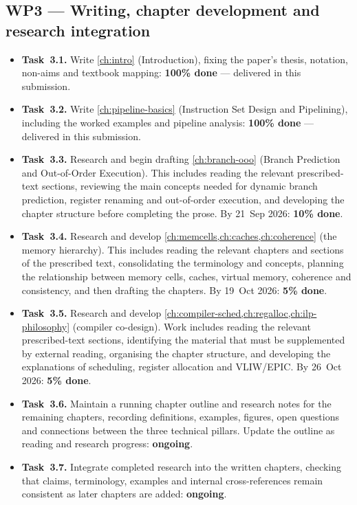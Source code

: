 \documentclass[12pt,a4paper]{report}
\begin{document}
\subsection*{WP3 --- Writing, chapter development and research integration}
\begin{itemize}[leftmargin=*]
  \item \textbf{Task~3.1.} Write \cref{ch:intro} (Introduction), fixing
    the paper's thesis, notation, non-aims and textbook mapping:
    \textbf{100\% done} --- delivered in this submission.

  \item \textbf{Task~3.2.} Write \cref{ch:pipeline-basics} (Instruction
    Set Design and Pipelining), including the worked examples and
    pipeline analysis: \textbf{100\% done} --- delivered in this
    submission.

  \item \textbf{Task~3.3.} Research and begin drafting
    \cref{ch:branch-ooo} (Branch Prediction and Out-of-Order
    Execution). This includes reading the relevant prescribed-text
    sections, reviewing the main concepts needed for dynamic branch
    prediction, register renaming and out-of-order execution, and
    developing the chapter structure before completing the prose. By
    21~Sep 2026: \textbf{10\% done}.

  \item \textbf{Task~3.4.} Research and develop
    \cref{ch:memcells,ch:caches,ch:coherence} (the memory hierarchy).
    This includes reading the relevant chapters and sections of the
    prescribed text, consolidating the terminology and concepts,
    planning the relationship between memory cells, caches, virtual
    memory, coherence and consistency, and then drafting the chapters.
    By 19~Oct 2026: \textbf{5\% done}.

  \item \textbf{Task~3.5.} Research and develop
    \cref{ch:compiler-sched,ch:regalloc,ch:ilp-philosophy} (compiler
    co-design). Work includes reading the relevant prescribed-text
    sections, identifying the material that must be supplemented by
    external reading, organising the chapter structure, and developing
    the explanations of scheduling, register allocation and VLIW/EPIC.
    By 26~Oct 2026: \textbf{5\% done}.

  \item \textbf{Task~3.6.} Maintain a running chapter outline and
    research notes for the remaining chapters, recording definitions,
    examples, figures, open questions and connections between the
    three technical pillars. Update the outline as reading and
    research progress: \textbf{ongoing}.

  \item \textbf{Task~3.7.} Integrate completed research into the
    written chapters, checking that claims, terminology, examples and
    internal cross-references remain consistent as later chapters are
    added: \textbf{ongoing}.
\end{itemize}
\end{document}

